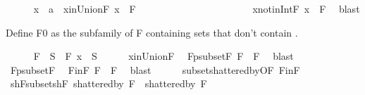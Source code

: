 \begin{isabellebody}
\ \ \ \ \isamarkupfalse%
\ x\ {\isacharcolon}{\kern0pt}{\isacharcolon}{\kern0pt}\ {\isacharprime}{\kern0pt}a\ \ x{\isacharunderscore}{\kern0pt}in{\isacharunderscore}{\kern0pt}Union{\isacharunderscore}{\kern0pt}F{\isacharcolon}{\kern0pt}\ {\isachardoublequoteopen}x\ {\isasymin}\ {\isasymUnion}F{\isachardoublequoteclose}\ \isanewline
\ \ \ \ \ \ \ \ \ \ \ \ \ \ \ \ \ \ \ \ \ \ x{\isacharunderscore}{\kern0pt}not{\isacharunderscore}{\kern0pt}in{\isacharunderscore}{\kern0pt}Int{\isacharunderscore}{\kern0pt}F{\isacharcolon}{\kern0pt}\ {\isachardoublequoteopen}x\ {\isasymnotin}\ {\isasymInter}F{\isachardoublequoteclose}\ \isamarkupfalse%
\ blast%
\begin{isamarkuptext}%
Define F0 as the subfamily of F containing sets that don't contain .%
\end{isamarkuptext}\isamarkuptrue%
\ \ \ \ \isamarkupfalse%
\ {\isacharquery}{\kern0pt}F{}\ {\isacharequal}{\kern0pt}\ {\isachardoublequoteopen}{\isacharbraceleft}{\kern0pt}S\ {\isasymin}\ F{\isachardot}{\kern0pt}\ x\ {\isasymnotin}\ S{\isacharbraceright}{\kern0pt}{\isachardoublequoteclose}\isanewline
\ \ \ \ \isamarkupfalse%
\ x{\isacharunderscore}{\kern0pt}in{\isacharunderscore}{\kern0pt}Union{\isacharunderscore}{\kern0pt}F\ \isamarkupfalse%
\ F{}{\isacharunderscore}{\kern0pt}psubset{\isacharunderscore}{\kern0pt}F{\isacharcolon}{\kern0pt}\ {\isachardoublequoteopen}{\isacharquery}{\kern0pt}F{}\ {\isasymsubset}\ F{\isachardoublequoteclose}\ \isamarkupfalse%
\ blast\isanewline
\ \ \ \ \isamarkupfalse%
\ F{}{\isacharunderscore}{\kern0pt}psubset{\isacharunderscore}{\kern0pt}F\ \isamarkupfalse%
\ F{}{\isacharunderscore}{\kern0pt}in{\isacharunderscore}{\kern0pt}F{\isacharcolon}{\kern0pt}\ {\isachardoublequoteopen}{\isacharquery}{\kern0pt}F{}\ {\isasymsubseteq}\ F{\isachardoublequoteclose}\ \isamarkupfalse%
\ blast\isanewline
\ \ \ \ \isamarkupfalse%
\ subset{\isacharunderscore}{\kern0pt}shattered{\isacharunderscore}{\kern0pt}by{\isacharbrackleft}{\kern0pt}OF\ F{}{\isacharunderscore}{\kern0pt}in{\isacharunderscore}{\kern0pt}F{\isacharbrackright}{\kern0pt}\ \isamarkupfalse%
\ shF{}{\isacharunderscore}{\kern0pt}subset{\isacharunderscore}{\kern0pt}shF{\isacharcolon}{\kern0pt}\ {\isachardoublequoteopen}shattered{\isacharunderscore}{\kern0pt}by\ {\isacharquery}{\kern0pt}F{}\ {\isasymsubseteq}\ shattered{\isacharunderscore}{\kern0pt}by\ F{\isachardoublequoteclose}\ \isacommand{{\isachardot}{\kern0pt}}\isamarkupfalse%

\end{isabellebody}
